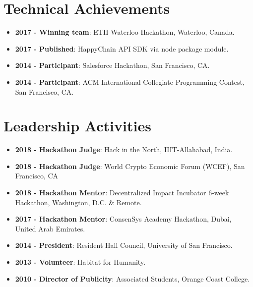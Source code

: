 \documentclass[letterpaper,11pt]{article}
\newcommand{\resumeItem}[2]{
  \item\small{
    \textbf{#1}{: #2 \vspace{-2pt}}
  }
}
\newcommand{\resumeSubItem}[2]{\resumeItem{#1}{#2}\vspace{-4pt}}
\newcommand{\resumeSubHeadingListStart}{\begin{itemize}[leftmargin=*]}
\newcommand{\resumeSubHeadingListEnd}{\end{itemize}}
\begin{document}
\section{Technical Achievements}
  \resumeSubHeadingListStart

    \resumeSubItem{2017 - Winning team}
        {ETH Waterloo Hackathon, Waterloo, Canada.}

    \resumeSubItem{2017 - Published}
        {HappyChain API SDK via node package module.}

    \resumeSubItem{2014 - Participant}
        {Salesforce Hackathon, San Francisco, CA.}

    \resumeSubItem{2014 - Participant}
        {ACM International Collegiate Programming Contest, San Francisco, CA.}

  \resumeSubHeadingListEnd


\section{Leadership Activities}
  \resumeSubHeadingListStart

     \resumeSubItem{2018 - Hackathon Judge}
        {Hack in the North, IIIT-Allahabad, India.}

    \resumeSubItem{2018 - Hackathon Judge}
        {World Crypto Economic Forum (WCEF), San Francisco, CA}

    \resumeSubItem{2018 - Hackathon Mentor}
        {Decentralized Impact Incubator 6-week Hackathon, Washington, D.C. \& Remote.}

    \resumeSubItem{2017 - Hackathon Mentor}
        {ConsenSys Academy Hackathon, Dubai, United Arab Emirates.}

    \resumeSubItem{2014 - President}
        {Resident Hall Council, University of San Francisco.}

    \resumeSubItem{2013 - Volunteer}
        {Habitat for Humanity.}

    \resumeSubItem{2010 - Director of Publicity}
        {Associated Students, Orange Coast College.}

  \resumeSubHeadingListEnd




\end{document}
